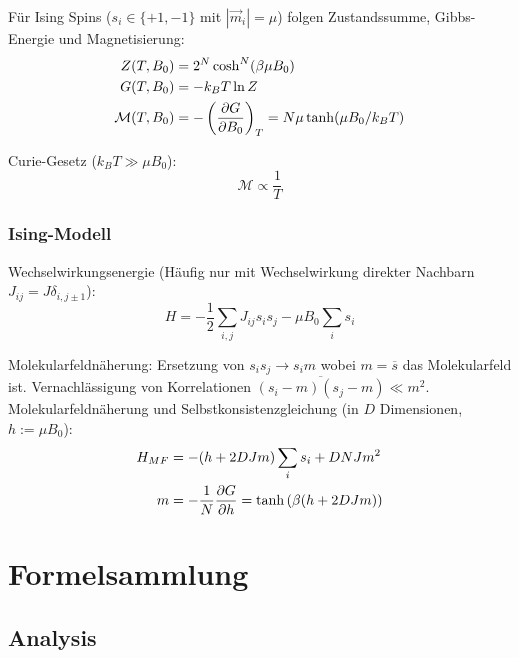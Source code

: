 \documentclass[11pt]{article}
\numberwithin{equation}{section}
\begin{document}
				\noindent
				Für Ising Spins ($s_i\in\lbrace +1, -1\rbrace$ mit $|\vec{m}_i| = \mu$) folgen Zustandssumme, Gibbs-Energie und Magnetisierung:
				\begin{equation}
					\begin{aligned}
						Z(T,B_0) &= 2^N \cosh^N (\beta\mu B_0) \\
						G(T,B_0) &= -k_B T \ln Z \\
						\mathcal{M}(T,B_0) &= -\left(\frac{\partial G}{\partial B_0}\right)_T = N\mu \tanh(\mu B_0 /k_B T)
					\end{aligned}
				\end{equation}

				\noindent
				Curie-Gesetz ($k_B T \gg \mu B_0$):
				\begin{equation}
					\mathcal{M} \propto \frac{1}{T}
				\end{equation}

			\subsubsection{Ising-Modell}
				\noindent
				Wechselwirkungsenergie (Häufig nur mit Wechselwirkung direkter Nachbarn $J_{ij} = J \delta_{i,j\pm 1}$):
				\begin{equation}
					H = -\frac{1}{2}\sum_{i,j} J_{ij} s_i s_j -\mu B_0 \sum_i s_i
				\end{equation}

				\noindent
				Molekularfeldnäherung: \newline Ersetzung von $s_i s_j \rightarrow s_i m$ wobei $m = \overline{s}$ das Molekularfeld ist. Vernachlässigung von Korrelationen $\overline{(s_i-m)(s_j-m)}\ll m^2$. \nl
				Molekularfeldnäherung und Selbstkonsistenzgleichung (in $D$ Dimensionen, $h:=\mu B_0$):
				\begin{equation}
					\begin{aligned}
						H_{MF} &= -(h + 2 D J m) \sum_i s_i + D N J m^2 \\
						m &= -\frac{1}{N}\frac{\partial G}{\partial h} = \tanh\left({\beta(h + 2 D J m)}\right)
					\end{aligned}
				\end{equation}



	\newpage
	\section{Formelsammlung}
		\subsection{Analysis}
\end{document}
